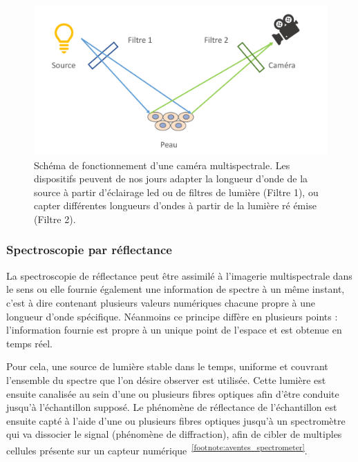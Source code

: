 \begin{figure}[H]
    \centering
    \includegraphics[width=\linewidth]{contents/chapter_2/resources/scheme_multispectral_principle.pdf}
    \caption{Schéma de fonctionnement d'une caméra multispectrale. Les dispositifs peuvent de nos jours adapter la longueur d'onde de la source à partir d'éclairage \gls{led} ou de filtres de lumière (Filtre 1), ou capter différentes longueurs d'ondes à partir de la lumière ré émise (Filtre 2).}
    \label{fig:scheme_multispectral_principle}
\end{figure}\par


\subsubsection{Spectroscopie par réflectance}
La spectroscopie de réflectance peut être assimilé à l'imagerie multispectrale dans le sens ou elle fournie également une information de spectre à un même instant, c'est à dire contenant plusieurs valeurs numériques chacune propre à une longueur d'onde spécifique. Néanmoins ce principe diffère en plusieurs points : l'information fournie est propre à un unique point de l'espace et est obtenue en temps réel.\par

Pour cela, une source de lumière stable dans le temps, uniforme et couvrant l'ensemble du spectre que l'on désire observer est utilisée. Cette lumière est ensuite canalisée au sein d'une ou plusieurs fibres optiques afin d'être conduite jusqu'à l'échantillon supposé. Le phénomène de réflectance de l'échantillon est ensuite capté à l'aide d'une ou plusieurs fibres optiques jusqu'à un spectromètre qui va dissocier le signal (phénomène de diffraction), afin de cibler de multiples cellules présente sur un capteur numérique~\cite{Murphy2005,Malla2008}\textsuperscript{\ref{footnote:aventes_spectrometer}}.\par

